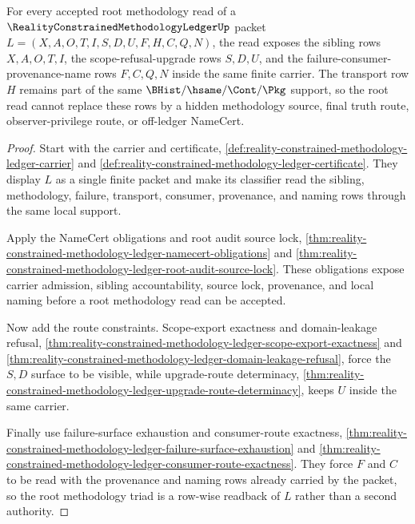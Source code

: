 \begin{theorem}
\label{thm:reality-constrained-methodology-ledger-methodology-root-triad}
For every accepted root methodology read of a
$\RealityConstrainedMethodologyLedgerUp$ packet
$L=(X,A,O,T,I,S,D,U,F,H,C,Q,N)$, the read exposes the sibling rows
$X,A,O,T,I$, the scope-refusal-upgrade rows $S,D,U$, and the
failure-consumer-provenance-name rows $F,C,Q,N$ inside the same finite carrier.
The transport row $H$ remains part of the same $\BHist/\hsame/\Cont/\Pkg$
support, so the root read cannot replace these rows by a hidden methodology
source, final truth route, observer-privilege route, or off-ledger NameCert.
\end{theorem}
\begin{proof}
Start with the carrier and certificate,
\autoref{def:reality-constrained-methodology-ledger-carrier} and
\autoref{def:reality-constrained-methodology-ledger-certificate}. They display
$L$ as a single finite packet and make its classifier read the sibling,
methodology, failure, transport, consumer, provenance, and naming rows through
the same local support.

Apply the NameCert obligations and root audit source lock,
\autoref{thm:reality-constrained-methodology-ledger-namecert-obligations} and
\autoref{thm:reality-constrained-methodology-ledger-root-audit-source-lock}.
These obligations expose carrier admission, sibling accountability, source
lock, provenance, and local naming before a root methodology read can be
accepted.

Now add the route constraints. Scope-export exactness and domain-leakage
refusal,
\autoref{thm:reality-constrained-methodology-ledger-scope-export-exactness}
and
\autoref{thm:reality-constrained-methodology-ledger-domain-leakage-refusal},
force the $S,D$ surface to be visible, while upgrade-route determinacy,
\autoref{thm:reality-constrained-methodology-ledger-upgrade-route-determinacy},
keeps $U$ inside the same carrier.

Finally use failure-surface exhaustion and consumer-route exactness,
\autoref{thm:reality-constrained-methodology-ledger-failure-surface-exhaustion}
and
\autoref{thm:reality-constrained-methodology-ledger-consumer-route-exactness}.
They force $F$ and $C$ to be read with the provenance and naming rows already
carried by the packet, so the root methodology triad is a row-wise readback of
$L$ rather than a second authority.
\end{proof}

